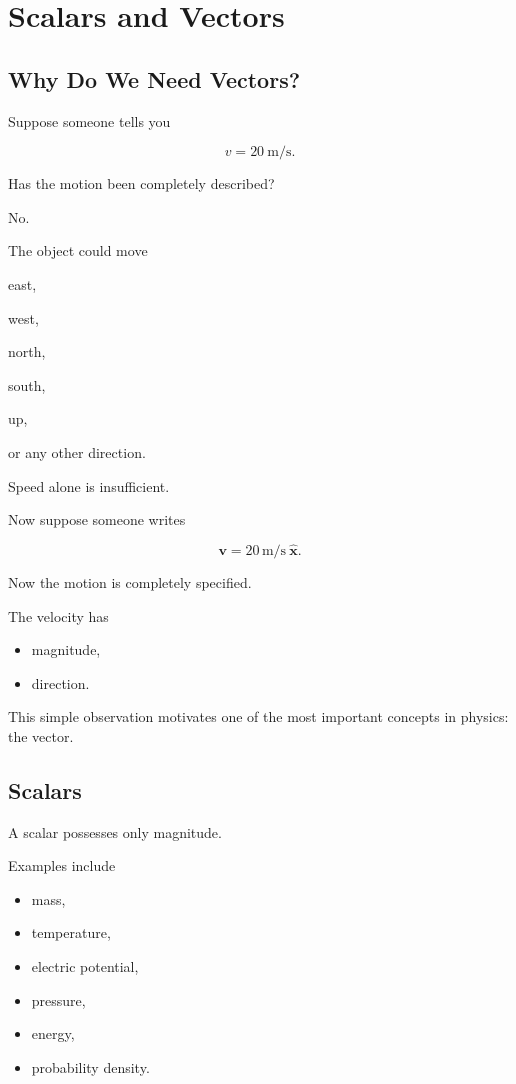 \section{Scalars and Vectors}
\label{sec:scalars-vectors}

\subsection{Why Do We Need Vectors?}

Suppose someone tells you

\[
v=20\ \mathrm{m/s}.
\]

Has the motion been completely described?

No.

The object could move

east,

west,

north,

south,

up,

or any other direction.

Speed alone is insufficient.

Now suppose someone writes

\[
\mathbf v=
20\,\mathrm{m/s}
\ \hat{\mathbf x}.
\]

Now the motion is completely specified.

The velocity has

\begin{itemize}
	\item magnitude,
	\item direction.
\end{itemize}

This simple observation motivates one of the most important concepts in
physics: the vector.


\subsection{Scalars}

A scalar possesses only magnitude.

Examples include

\begin{itemize}
	\item mass,
	\item temperature,
	\item electric potential,
	\item pressure,
	\item energy,
	\item probability density.
\end{itemize}

